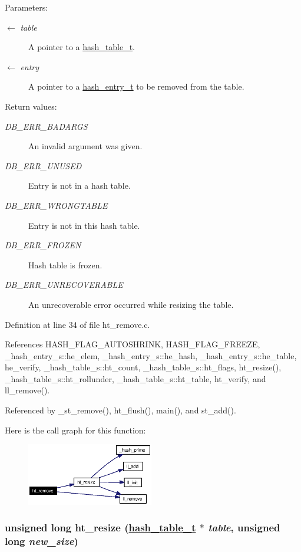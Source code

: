 \begin{Desc}
\item[Parameters:]
\begin{description}
\item[\mbox{$\leftarrow$} {\em table}]A pointer to a \hyperlink{group__dbprim__hash_ga1}{hash\_\-table\_\-t}. \item[\mbox{$\leftarrow$} {\em entry}]A pointer to a \hyperlink{group__dbprim__hash_ga2}{hash\_\-entry\_\-t} to be removed from the table.\end{description}
\end{Desc}
\begin{Desc}
\item[Return values:]
\begin{description}
\item[{\em DB\_\-ERR\_\-BADARGS}]An invalid argument was given. \item[{\em DB\_\-ERR\_\-UNUSED}]Entry is not in a hash table. \item[{\em DB\_\-ERR\_\-WRONGTABLE}]Entry is not in this hash table. \item[{\em DB\_\-ERR\_\-FROZEN}]Hash table is frozen. \item[{\em DB\_\-ERR\_\-UNRECOVERABLE}]An unrecoverable error occurred while resizing the table.\end{description}
\end{Desc}


Definition at line 34 of file ht\_\-remove.c.

References HASH\_\-FLAG\_\-AUTOSHRINK, HASH\_\-FLAG\_\-FREEZE, \_\-hash\_\-entry\_\-s::he\_\-elem, \_\-hash\_\-entry\_\-s::he\_\-hash, \_\-hash\_\-entry\_\-s::he\_\-table, he\_\-verify, \_\-hash\_\-table\_\-s::ht\_\-count, \_\-hash\_\-table\_\-s::ht\_\-flags, ht\_\-resize(), \_\-hash\_\-table\_\-s::ht\_\-rollunder, \_\-hash\_\-table\_\-s::ht\_\-table, ht\_\-verify, and ll\_\-remove().

Referenced by \_\-st\_\-remove(), ht\_\-flush(), main(), and st\_\-add().

Here is the call graph for this function:\begin{figure}[H]
\begin{center}
\leavevmode
\includegraphics[width=157pt]{group__dbprim__hash_ga12_cgraph}
\end{center}
\end{figure}
\hypertarget{group__dbprim__hash_ga16}{
\subsubsection[ht\_\-resize]{\setlength{\rightskip}{0pt plus 5cm}unsigned long ht\_\-resize (\hyperlink{struct__hash__table__s}{hash\_\-table\_\-t} $\ast$ {\em table}, unsigned long {\em new\_\-size})}}
\label{group__dbprim__hash_ga16}


